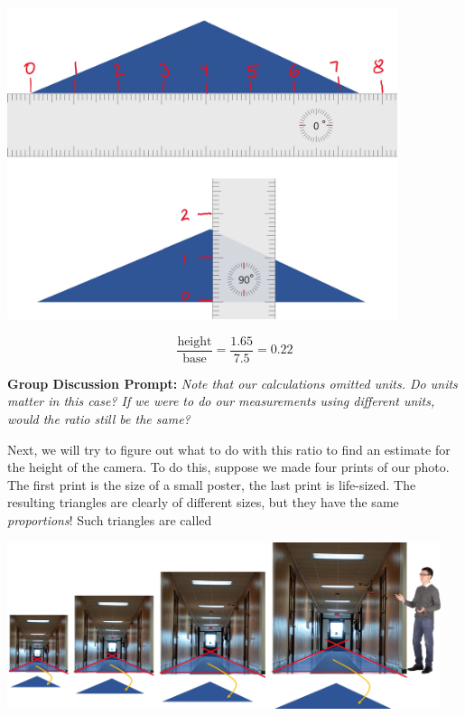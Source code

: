 \documentclass{ximera}
\begin{document}
\begin{exploration}
\begin{image}
         \includegraphics[width=4.5in]{triangleMeasures1.jpg}
\end{image}

$$\frac{\text{height}}{\text{base}}=\frac{1.65}{7.5}=0.22$$

\textbf{Group Discussion Prompt:}
    \emph{Note that our calculations omitted units.  Do units matter in this case?  If we were to do our measurements using different units, would the ratio still be the same?} 

Next, we will try to figure out what to do with this ratio to find an estimate for the height of the camera.  To do this, suppose we made four prints of our photo.  The first print is the size of a small poster, the last print is life-sized.  The resulting triangles are clearly of different sizes, but they have the same \emph{proportions}!  Such triangles are called 

\begin{image}
         \includegraphics[width=5in]{similarHallways.jpg}
\end{image}


\end{exploration}
\end{document}
